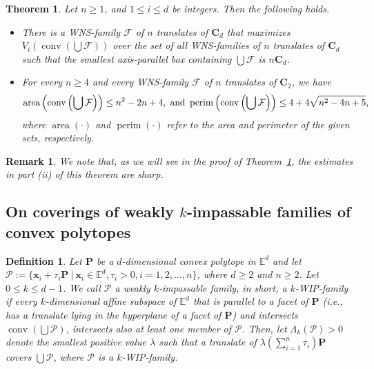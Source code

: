 \documentclass[12pt]{article}
\newtheorem{thm}{Theorem}
\newtheorem{defn}{Definition}
\newtheorem{rem}{Remark}
\DeclareMathOperator{\conv}{conv}
\DeclareMathOperator{\area}{area}
\DeclareMathOperator{\perim}{perim}
\newcommand{\xx}{\mathbf{x}}
\newcommand{\Ee}{{\mathbb E}}
\newcommand{\C}{\mathbf{C}}
\begin{document}
\begin{thm}\label{thm:WNScubes}
Let $n \geq 1$, and $1 \leq i \leq d$ be integers. Then the following holds.
\begin{itemize}
\item[(i)] There is a WNS-family $\mathcal{F}$ of $n$ translates of $\C_d$ that maximizes $V_i\left( \conv \left( \bigcup \mathcal{F}\right) \right)$ over the set of all WNS-families of $n$ translates of $\C_d$ such that the smallest axis-parallel box containing $\bigcup \mathcal{F}$ is $n \C_d$.
\item[(ii)] For every $n \geq 4$ and every WNS-family $\mathcal{F}$ of $n$ translates of $\C_2$, we have
\[
\area\left( \conv \left( \bigcup \mathcal{F}\right) \right)  \leq n^2 - 2n+4, \ \hbox{and} \  \perim\left( \conv \left( \bigcup \mathcal{F}\right) \right)  \leq 4+ 4\sqrt{n^2 - 4n+5},
\]
where $\area(\cdot)$ and $\perim(\cdot)$ refer to the area and perimeter of the given sets, respectively.
\end{itemize}
\end{thm}

\begin{rem}
We note that, as we will see in the proof of Theorem~\ref{thm:WNScubes}, the estimates in part (ii) of this theorem are sharp.
\end{rem}

\subsection{On coverings of weakly $k$-impassable families of convex polytopes}

\begin{defn}\label{Bezdek-Langi extended}
Let $\mathbf{P}$ be a $d$-dimensional convex polytope in $\Ee^d$ and let $\mathcal{P} := \{ \xx_i + \tau_i \mathbf{P}\ |\  \xx_i\in \Ee^d, \tau_i>0, i=1,2,\ldots, n\}$, where $d\ge 2$ and $n\ge 2$. Let $0\leq k\leq d-1$.
We call $\mathcal{P}$ a \emph{weakly $k$-impassable family}, in short, a \emph{$k$-WIP-family} if every $k$-dimensional affine subspace of $\Ee^d$ that is parallel to a facet of $\mathbf{P}$ (i.e., has a translate lying in the hyperplane of a facet of $\mathbf{P}$) and intersects $\conv \left( \bigcup \mathcal{P} \right)$, intersects also at least one member of $\mathcal{P}$. Then, let $\Lambda_k(\mathcal{P}) > 0$ denote the smallest positive value $\lambda$ such that a translate of
$\lambda \left( \sum_{i=1}^n \tau_i \right) \mathbf{P}$ covers $\bigcup \mathcal{P}$, where $\mathcal{P}$ is a $k$-WIP-family.
\end{defn}
\end{document}
